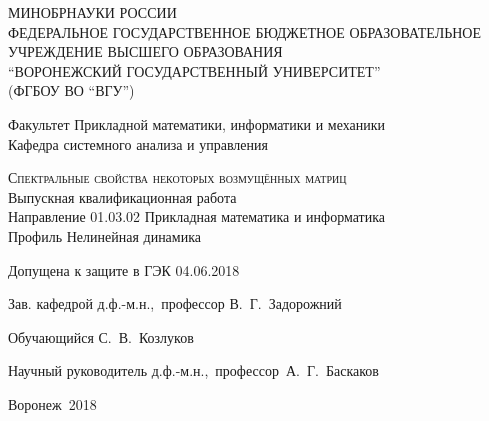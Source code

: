 \documentclass[14pt,a4paper]{extarticle}
\numberwithin{equation}{section}
\theoremstyle{definition}
\begin{document}
\pagestyle{empty}

\newpage

{
\makeatletter
{
  \null
  \thispagestyle{empty}
  \newpage
}

\setcounter{page}{0}
\begin{center}
  МИНОБРНАУКИ РОССИИ\\
  ФЕДЕРАЛЬНОЕ ГОСУДАРСТВЕННОЕ БЮДЖЕТНОЕ ОБРАЗОВАТЕЛЬНОЕ УЧРЕЖДЕНИЕ ВЫСШЕГО
  ОБРАЗОВАНИЯ\\ ``ВОРОНЕЖСКИЙ ГОСУДАРСТВЕННЫЙ УНИВЕРСИТЕТ''\\
(ФГБОУ ВО ``ВГУ'')
\end{center}

\vfill

\begin{center}
  Факультет Прикладной математики, информатики и механики\\
  Кафедра системного анализа и управления
\end{center}

\vfill

\begin{center}
  \textsc{\Large Спектральные свойства некоторых возмущённых матриц}\\[.5cm]
  Выпускная квалификационная работа\\
  Направление 01.03.02 Прикладная математика и информатика\\
  Профиль Нелинейная динамика
\end{center}

\vfill

\begin{center}
  {Допущена к защите в ГЭК 04.06.2018\hfill\hfill}
\end{center}

\vfill
\begin{center}
  {Зав. кафедрой \hfill д.ф.-м.н.,~профессор В.~Г.~Задорожний}
  \vspace{1cm}

  {Обучающийся \hfill С.~В.~Козлуков}

  \vspace{1cm}
  {Научный руководитель \hfill д.ф.-м.н.,~профессор~А.~Г.~Баскаков}
\end{center}
 
\vfill
\begin{center}
  Воронеж~2018
\end{center}
}

{
\pagestyle{empty}
\newpage
}
\setcounter{tocdepth}{2}
\pagestyle{fancy}
\tableofcontents
\newpage
\end{document}
